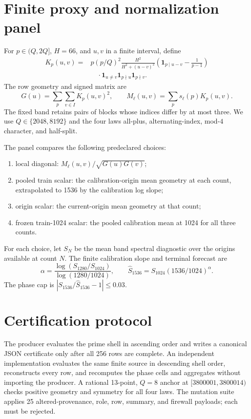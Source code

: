 \documentclass[10pt]{article}
\begin{document}
\section{Finite proxy and normalization panel}

For $p\in(Q,2Q]$, $H=66$, and $u,v$ in a finite interval, define
\begin{align*}
 K_p(u,v)={}&p(p/Q)^2\frac{H^2}{H^2+(u-v)^2}
 \left(\mathbf 1_{p\mid u-v}-\frac{1}{p-1}\right)\\
 &\quad\cdot\mathbf 1_{u\ne v}\mathbf 1_{p\nmid u}\mathbf 1_{p\nmid v}.
\end{align*}
The row geometry and signed matrix are
\[
 G(u)=\sum_{p}\sum_{v\in I}K_p(u,v)^2,
 \qquad M_\ell(u,v)=\sum_p s_\ell(p)K_p(u,v).
\]
The fixed band retains pairs of blocks whose indices differ by at most three.
We use $Q\in\{2048,8192\}$ and the four laws all-plus, alternating-index,
mod-$4$ character, and half-split.

The panel compares the following predeclared choices:
\begin{enumerate}
\item local diagonal: $M_\ell(u,v)/\sqrt{G(u)G(v)}$;
\item pooled train scalar: the calibration-origin mean geometry at each
      count, extrapolated to 1536 by the calibration log slope;
\item origin scalar: the current-origin mean geometry at that count;
\item frozen train-1024 scalar: the pooled calibration mean at 1024 for all
      three counts.
\end{enumerate}
For each choice, let $S_N$ be the mean band spectral diagnostic over the
origins available at count $N$.  The finite calibration slope and terminal
forecast are
\[
 \alpha=\frac{\log(S_{1280}/S_{1024})}{\log(1280/1024)},
 \qquad \widehat S_{1536}=S_{1024}(1536/1024)^\alpha.
\]
The phase cap is $|S_{1536}/\widehat S_{1536}-1|\leq0.03$.

\section{Certification protocol}

The producer evaluates the prime shell in ascending order and writes a
canonical JSON certificate only after all 256 rows are complete.  An
independent implementation evaluates the same finite source in descending
shell order, reconstructs every row, and recomputes the phase cells and
aggregates without importing the producer.  A rational 13-point, $Q=8$
anchor at $[3800001,3800014)$ checks positive geometry and symmetry for all
four laws.  The mutation suite applies 25 altered-provenance, role, row,
summary, and firewall payloads; each must be rejected.
\end{document}
